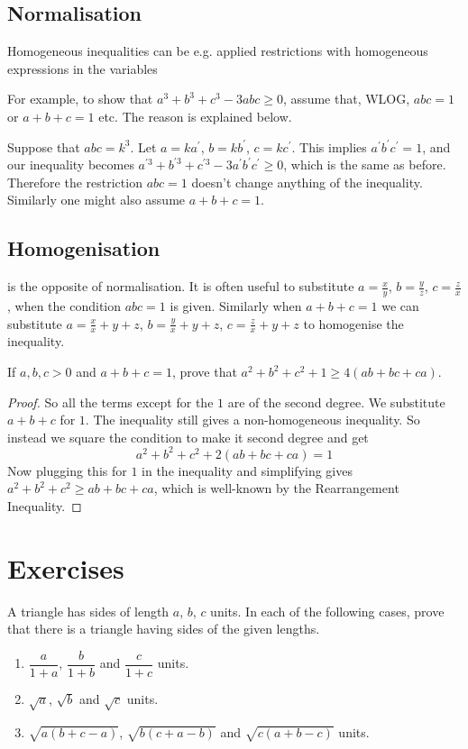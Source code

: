 \subsection{Normalisation}
Homogeneous inequalities can be  e.g. applied restrictions with homogeneous expressions in the variables

For example, to show that $a^3+b^3+c^3-3abc\ge0$, assume that, WLOG, $abc=1$ or $a+b+c=1$ etc. The reason is explained below.

Suppose that $abc=k^3$. Let $a=ka^\prime$, $b=kb^\prime$, $c=kc^\prime$. This implies $a^\prime b^\prime c^\prime=1$, and our inequality becomes $a^{\prime3}+b^{\prime3}+c^{\prime3}-3a^\prime b^\prime c^\prime\ge0$, which is the same as before. Therefore the restriction $abc=1$ doesn't change anything of the inequality. Similarly one might also assume $a+b+c=1$.

\subsection{Homogenisation}
 is the opposite of normalisation. It is often useful to substitute $a=\frac{x}{y}$, $b=\frac{y}{z}$, $c=\frac{z}{x}$, when the condition $abc=1$ is given. Similarly when $a+b+c=1$ we can substitute $a=\frac{x}{x}+y+z$, $b=\frac{y}{x}+y+z$, $c=\frac{z}{x}+y+z$ to homogenise the inequality.

\begin{exercise}
If $a,b,c>0$ and $a+b+c=1$, prove that $a^2+b^2+c^2+1\ge 4(ab+bc+ca)$.
\end{exercise}

\begin{proof}
So all the terms except for the $1$ are of the second degree. We substitute $a+b+c$ for $1$. The inequality still gives a non-homogeneous inequality. So instead we square the condition to make it second degree and get\[a^2+b^2+c^2+2(ab+bc+ca)=1\]Now plugging this for $1$ in the inequality and simplifying gives $a^2+b^2+c^2\ge ab+bc+ca$, which is well-known by the Rearrangement Inequality.
\end{proof}
\pagebreak

\section*{Exercises}
\begin{prbm}
A triangle has sides of length $a$, $b$, $c$ units. In each of the following cases, prove that there is a triangle having sides of the given lengths.
\begin{enumerate}[label=(\alph*)]
\item $\dfrac{a}{1+a}$, $\dfrac{b}{1+b}$ and $\dfrac{c}{1+c}$ units.
\item $\sqrt{a}$, $\sqrt{b}$ and $\sqrt{c}$ units.
\item $\sqrt{a(b+c-a)}$, $\sqrt{b(c+a-b)}$ and $\sqrt{c(a+b-c)}$ units.
\end{enumerate}
\end{prbm}

